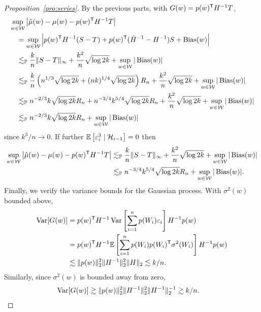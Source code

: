 \begin{proof}[Proposition~\ref{pro:series}]

  By the previous parts,
  with $G(w) = p(w)^{\mathsf{T}} H^{-1} T$,
  \begin{align*}
    &\sup_{w \in \mathcal{W}}
    \left|
    \hat\mu(w) - \mu(w)
    - p(w)^{\mathsf{T}} H^{-1} T
    \right| \\
    &\quad=
    \sup_{w \in \mathcal{W}}
    \left|
    p(w)^{\mathsf{T}} H^{-1} (S - T)
    + p(w)^{\mathsf{T}} (\hat H^{-1} - H^{-1}) S
    + \operatorname{Bias}(w)
    \right| \\
    &\quad\lesssim_{\mathbb{P}}
    \frac{k}{n}
    \|S - T\|_\infty
    + \frac{k^2}{n} \sqrt{\log 2k}
    + \sup_{w \in \mathcal{W}} |\operatorname{Bias}(w)| \\
    &\quad\lesssim_{\mathbb{P}}
    \frac{k}{n}
    \left( n^{1/3} \sqrt{\log 2k} + (n k)^{1/4} \sqrt{\log 2k} \right) R_n
    + \frac{k^2}{n} \sqrt{\log 2k}
    + \sup_{w \in \mathcal{W}} |\operatorname{Bias}(w)| \\
    &\quad\lesssim_{\mathbb{P}}
    n^{-2/3} k \sqrt{\log 2k} R_n
    + n^{-3/4} k^{5/4} \sqrt{\log 2k} R_n
    + \frac{k^2}{n} \sqrt{\log 2k}
    + \sup_{w \in \mathcal{W}} |\operatorname{Bias}(w)| \\
    &\quad\lesssim_{\mathbb{P}}
    n^{-2/3} k \sqrt{\log 2k} R_n
    + \sup_{w \in \mathcal{W}} |\operatorname{Bias}(w)|
  \end{align*}
  since $k^3/n \to 0$.
  If further $\mathbb{E} \left[ \varepsilon_i^3 \mid \mathcal{H}_{i-1} \right] = 0$ then
  \begin{align*}
    \sup_{w \in \mathcal{W}}
    \left|
    \hat\mu(w) - \mu(w)
    - p(w)^{\mathsf{T}} H^{-1} T
    \right|
    &\lesssim_{\mathbb{P}}
    \frac{k}{n}
    \|S - T\|_\infty
    + \frac{k^2}{n} \sqrt{\log 2k}
    + \sup_{w \in \mathcal{W}} |\operatorname{Bias}(w)| \\
    &\lesssim_{\mathbb{P}}
    n^{-3/4} k^{5/4} \sqrt{\log 2k} R_n
    + \sup_{w \in \mathcal{W}} |\operatorname{Bias}(w)|.
  \end{align*}
  Finally, we verify the variance bounds for the Gaussian process.
  With $\sigma^2(w)$ bounded above,
  \begin{align*}
    \operatorname{Var}[G(w)]
    &=
    p(w)^{\mathsf{T}} H^{-1}
    \operatorname{Var}\left[ \sum_{i=1}^n p(W_i) \varepsilon_i \right]
    H^{-1} p(w) \\
    &=
    p(w)^{\mathsf{T}} H^{-1}
    \mathbb{E}\left[\sum_{i=1}^n p(W_i) p(W_i)^{\mathsf{T}} \sigma^2(W_i) \right]
    H^{-1} p(w) \\
    &\lesssim
    \|p(w)\|_2^2 \|H^{-1}\|_2^2
    \|H\|_2
    \lesssim
    k/n.
  \end{align*}
  Similarly, since $\sigma^2(w)$ is bounded away from zero,
  \begin{align*}
    \operatorname{Var}[G(w)]
    &\gtrsim
    \|p(w)\|_2^2 \|H^{-1}\|_2^2
    \|H^{-1}\|_2^{-1}
    \gtrsim
    k/n.
  \end{align*}


\end{proof}
